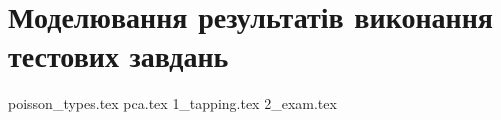 \chapter{Моделювання результатів виконання тестових завдань}

{poisson_types.tex}
{pca.tex}
{1_tapping.tex}
{2_exam.tex}
